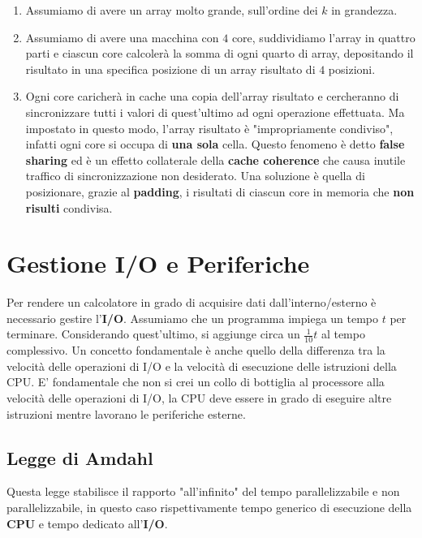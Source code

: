 \documentclass{article}
\begin{document}
\vspace*{12px}

\begin{enumerate}
    \item Assumiamo di avere un array molto grande, sull'ordine dei $k$ in grandezza.
    \vspace*{12px}
    \item Assumiamo di avere una macchina con $4$ core, suddividiamo l'array in quattro parti e ciascun core calcolerà la somma di ogni quarto di array, depositando il risultato in una specifica posizione di un array risultato di $4$ posizioni.
    \newpage
    \item Ogni core caricherà in cache una copia dell'array risultato e cercheranno di sincronizzare tutti i valori di quest'ultimo ad ogni operazione effettuata. Ma impostato in questo modo, l'array risultato è "impropriamente condiviso", infatti ogni core si occupa di \textbf{una sola} cella. Questo fenomeno è detto \textbf{false sharing} ed è un effetto collaterale della \textbf{cache coherence} che causa inutile traffico di sincronizzazione non desiderato. Una soluzione è quella di posizionare, grazie al \textbf{padding}, i risultati di ciascun core in memoria che \textbf{non risulti} condivisa.
\end{enumerate}

\section{Gestione I/O e Periferiche}

Per rendere un calcolatore in grado di acquisire dati dall'interno/esterno è necessario gestire l'\textbf{I/O}. Assumiamo che un programma impiega un tempo $t$ per terminare. Considerando quest'ultimo, si aggiunge circa un $\frac{1}{10}t$ al tempo complessivo.
Un concetto fondamentale è anche quello della differenza tra la velocità delle operazioni di I/O e la velocità di esecuzione delle istruzioni della CPU. E' fondamentale che non si crei un collo di bottiglia al processore alla velocità delle operazioni di I/O, la CPU deve essere in grado di eseguire altre istruzioni mentre lavorano le periferiche esterne.

\subsection{Legge di Amdahl}

Questa legge stabilisce il rapporto "all'infinito" del tempo parallelizzabile e non parallelizzabile, in questo caso rispettivamente tempo generico di esecuzione della \textbf{CPU} e tempo dedicato all'\textbf{I/O}.
\end{document}
